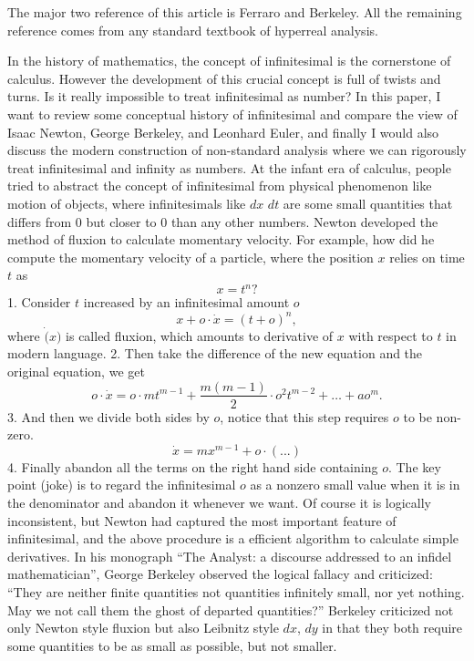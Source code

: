 \documentclass[11pt]{article}
\begin{document}
The major two reference of this article is Ferraro and Berkeley. All the remaining reference comes from any standard textbook of hyperreal analysis.

In the history of mathematics, the concept of infinitesimal is the cornerstone of calculus. However the development of this crucial concept is full of twists and turns. Is it really impossible to treat infinitesimal as number? In this paper, I want to review some conceptual history of infinitesimal and compare the view of Isaac Newton, George Berkeley, and Leonhard Euler, and finally I would also discuss the modern construction of non-standard analysis where we can rigorously treat infinitesimal and infinity as numbers. 
At the infant era of calculus, people tried to abstract the concept of infinitesimal from physical phenomenon like motion of objects, where infinitesimals like $dx$ $dt$ are some small quantities that differs from 0 but closer to $0$ than any other numbers. Newton developed the method of fluxion to calculate momentary velocity. For example, how did he compute the momentary velocity of a particle, where the position $x$ relies on time $t$ as 
$$
x=t^n?
$$
1. Consider $t$ increased by an infinitesimal amount $o$ 
$$
x+o\cdot \dot{x}=(t+o)^n,
$$ 
where $\dot(x)$ is called fluxion, which amounts to derivative of $x$ with respect to $t$ in modern language. 
2. Then take the difference of the new equation and the original equation, we get
$$
o\cdot\dot{x}=o\cdot mt^{m-1}+\frac{m(m-1)}{2}\cdot o^2 t^{m-2}+…+a o^m.
$$
3. And then we divide both sides by $o$, notice that this step requires $o$ to be non-zero.
$$
\dot{x}=m x^{m-1}+o\cdot (...)
$$
4. Finally abandon all the terms on the right hand side containing $o$.
The key point (joke) is to regard the infinitesimal $o$ as a nonzero small value when it is in the denominator and abandon it whenever we want. Of course it is logically inconsistent, but Newton had captured the most important feature of infinitesimal, and the above procedure is a efficient algorithm to calculate simple derivatives.  
In his monograph “The Analyst: a discourse addressed to an infidel mathematician”, George Berkeley observed the logical fallacy and criticized:
“They are neither finite quantities not quantities infinitely small, nor yet nothing. May we not call them the ghost of departed quantities?”
	Berkeley criticized not only Newton style fluxion but also Leibnitz style $dx$, $dy$ in that they both require some quantities to be as small as possible, but not smaller. 
\end{document}
